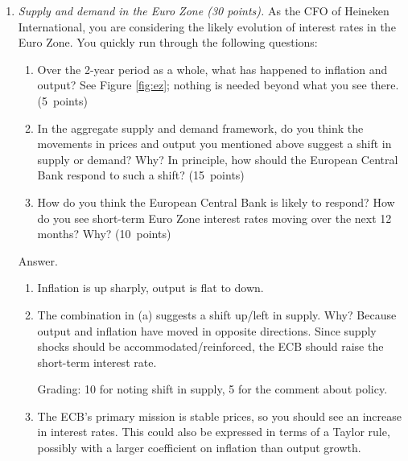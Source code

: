 \documentclass[letterpaper,12pt]{article}
\begin{document}
\begin{enumerate}
\item {\it Supply and demand in the Euro Zone (30 points).\/}
As the CFO of Heineken International, you are considering
the likely evolution of interest rates in the Euro Zone.  
You quickly run through the following questions:  
%
\begin{enumerate}

\item Over the 2-year period as a whole, 
    what has happened to inflation and output?  
    See Figure \ref{fig:ez}; 
    nothing is needed beyond what you see there.
    (5~points)

\item In the aggregate supply and demand framework, 
    do you think the movements in prices and output 
    you mentioned above suggest a shift in supply or demand?  Why?  
    In principle, 
    how should the European Central Bank respond to such a shift? 
    (15~points) 

\item How do you think the European Central Bank is 
likely to respond?
How do you see short-term Euro Zone 
interest rates moving over the next 12 months? Why?  
(10~points) 

\end{enumerate}

Answer.
\begin{enumerate}
\item Inflation is up sharply, output is flat to down. 

\item The combination in (a) suggests a shift up/left in supply.
Why?  Because output and inflation have moved in opposite directions.
Since supply shocks should be accommodated/reinforced, 
the ECB should raise the short-term interest rate.

Grading:  10 for noting shift in supply, 
5 for the comment about policy.  

\item The ECB's primary mission is stable prices, 
so you should see an increase in interest rates.
This could also be expressed in terms of a Taylor rule, 
possibly with a larger coefficient on inflation 
than output growth.  

\end{enumerate}



\end{enumerate}
\end{document}
